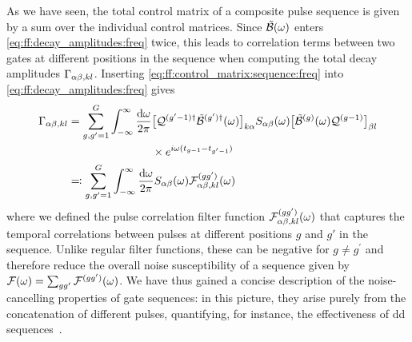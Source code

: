 As we have seen, the total control matrix of a composite pulse sequence is given by a sum over the individual control matrices.
Since $\tilde{\mathcal{B}}(\omega)$ enters \cref{eq:ff:decay_amplitudes:freq} twice, this leads to correlation terms between two gates at different positions in the sequence when computing the total decay amplitudes $\Gamma_{\alpha\beta,kl}$.
Inserting \cref{eq:ff:control_matrix:sequence:freq} into \cref{eq:ff:decay_amplitudes:freq} gives
\begin{align}\label{eq:ff:decay_amplitudes:pulse_correlation}
        \Gamma_{\alpha\beta,kl} &= \begin{aligned}[t]
            \sum_{g,g^\prime=1}^{G}\int_{-\infty}^\infty\frac{\dd{\omega}}{2\pi} &
            \bigl[\mathcal{Q}^{(g^\prime-1)\dagger}\tilde{\mathcal{B}}^{(g^\prime)\dagger}(\omega)\bigr]_{k\alpha}
            S_{\alpha\beta}(\omega)
            \bigl[\tilde{\mathcal{B}}^{(g)}(\omega)\mathcal{Q}^{(g-1)}\bigr]_{\beta l} \\
            &\times e^{i\omega(t_{g-1} - t_{g^\prime-1})} \\
        \end{aligned} \notag\\
        &\eqqcolon\sum_{g,g^\prime=1}^{G}\int_{-\infty}^\infty\frac{\dd{\omega}}{2\pi} S_{\alpha\beta}(\omega) \mathcal{F}_{\alpha\beta,kl}^{(gg^\prime)}(\omega)
\end{align}
where we defined the pulse correlation filter function $\mathcal{F}_{\alpha\beta,kl}^{(gg^\prime)}(\omega)$ that captures the temporal correlations between pulses at different positions $g$ and $g'$ in the sequence.
Unlike regular filter functions, these can be negative for $g\neq g^\prime$ and therefore reduce the overall noise susceptibility of a sequence given by $\mathcal{F}(\omega) = \sum_{gg^\prime}\mathcal{F}^{(gg^\prime)}(\omega)$.
We have thus gained a concise description of the noise-cancelling properties of gate sequences: in this picture, they arise purely from the concatenation of different pulses, quantifying, for instance, the effectiveness of \gls{dd} sequences~\cite{Cerfontaine2021}.

